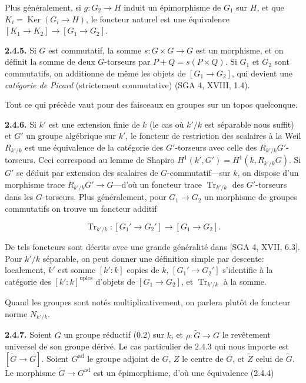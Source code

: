 \documentclass[10pt,a4paper]{article}
\newcommand{\SourcePage}[2]{\clearpage\setcounter{page}{#2}\typeout{D031_SOURCE_PAGE physical=#1 printed=#2}}
\begin{document}
Plus généralement, si \(g:G_2\to H\) induit un épimorphisme de \(G_1\) sur \(H\), et que \(K_i=\operatorname{Ker}(G_i\to H)\), le foncteur naturel est une équivalence \([K_1\to K_2]\to[G_1\to G_2]\).

\textbf{2.4.5.} Si \(G\) est commutatif, la somme \(s:G\times G\to G\) est un morphisme, et on définit la somme de deux \(G\)-torseurs par \(P+Q=s(P\times Q)\). Si \(G_1\) et \(G_2\) sont commutatifs, on additionne de même les objets de \([G_1\to G_2]\), qui devient une \emph{catégorie de Picard} (strictement commutative) (SGA 4, XVIII, 1.4).

\SourcePage{30}{276}
Tout ce qui précède vaut pour des faisceaux en groupes sur un topos quelconque.

\textbf{2.4.6.} Si \(k'\) est une extension finie de \(k\) (le cas où \(k'/k\) est séparable nous suffit) et \(G'\) un groupe algébrique sur \(k'\), le foncteur de restriction des scalaires à la Weil \(R_{k'/k}\) est une équivalence de la catégorie des \(G'\)-torseurs avec celle des \(R_{k'/k}G'\)-torseurs. Ceci correspond au lemme de Shapiro \(H^1(k',G')=H^1(k,R_{k'/k}G)\). Si \(G'\) se déduit par extension des scalaires de \(G\)-commutatif---sur \(k\), on dispose d'un morphisme trace \(R_{k'/k}G'\to G\)---d'où un foncteur trace \(\operatorname{Tr}_{k'/k}\) des \(G'\)-torseurs dans les \(G\)-torseurs. Plus généralement, pour \(G_1\to G_2\) un morphisme de groupes commutatifs on trouve un foncteur additif

\[
\operatorname{Tr}_{k'/k}:[G_1'\longrightarrow G_2']\longrightarrow[G_1\longrightarrow G_2]. \tag{2.4.6.1}
\]

De tels foncteurs sont décrits avec une grande généralité dans {[}SGA 4, XVII, 6.3{]}. Pour \(k'/k\) séparable, on peut donner une définition simple par descente: localement, \(k'\) est somme \([k':k]\) copies de \(k\), \([G_1'\to G_2']\) s'identifie à la catégorie des \([k':k]^{\mathrm{uples}}\) d'objets de \([G_1\to G_2]\), et \(\operatorname{Tr}_{k'/k}\) à la somme.

Quand les groupes sont notés multiplicativement, on parlera plutôt de foncteur norme \(N_{k'/k}\).

\textbf{2.4.7.} Soient \(G\) un groupe réductif (0.2) sur \(k\), et \(\rho:\widetilde G\to G\) le revêtement universel de son groupe dérivé. Le cas particulier de 2.4.3 qui nous importe est \([\widetilde G\to G]\). Soient \(G^{\mathrm{ad}}\) le groupe adjoint de \(G\), \(Z\) le centre de \(G\), et \(\widetilde Z\) celui de \(\widetilde G\). Le morphisme \(\widetilde G\to G^{\mathrm{ad}}\) est un épimorphisme, d'où une équivalence (2.4.4)
\end{document}

